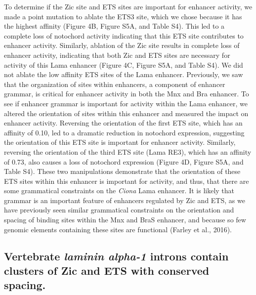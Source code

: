 To determine if the Zic site and ETS sites are important for enhancer activity, we made a point mutation to ablate the ETS3 site, which we chose because it has the highest affinity (Figure 4B, Figure S5A, and Table S4). This led to a complete loss of notochord activity indicating that this ETS site contributes to enhancer activity. Similarly, ablation of the Zic site results in complete loss of enhancer activity, indicating that both Zic and ETS sites are necessary for activity of this Lama enhancer (Figure 4C, Figure S5A, and Table S4). We did not ablate the low affinity ETS sites of the Lama enhancer. Previously, we saw that the organization of sites within enhancers, a component of enhancer grammar, is critical for enhancer activity in both the Mnx and Bra enhancer. To see if enhancer grammar is important for activity within the Lama enhancer, we altered the orientation of sites within this enhancer and measured the impact on enhancer activity. Reversing the orientation of the first ETS site, which has an affinity of 0.10, led to a dramatic reduction in notochord expression, suggesting the orientation of this ETS site is important for enhancer activity. Similarly, reversing the orientation of the third ETS site (Lama RE3), which has an affinity of 0.73, also causes a loss of notochord expression (Figure 4D, Figure S5A, and Table S4). These two manipulations demonstrate that the orientation of these ETS sites within this enhancer is important for activity, and thus, that there are some grammatical constraints on the \textit{Ciona} Lama enhancer. It is likely that grammar is an important feature of enhancers regulated by Zic and ETS, as we have previously seen similar grammatical constraints on the orientation and spacing of binding sites within the Mnx and BraS enhancer, and because so few genomic elements containing these sites are functional (Farley et al., 2016). 

\subsection{Vertebrate \textit{laminin alpha-1} introns contain clusters of Zic and ETS with conserved spacing.}

